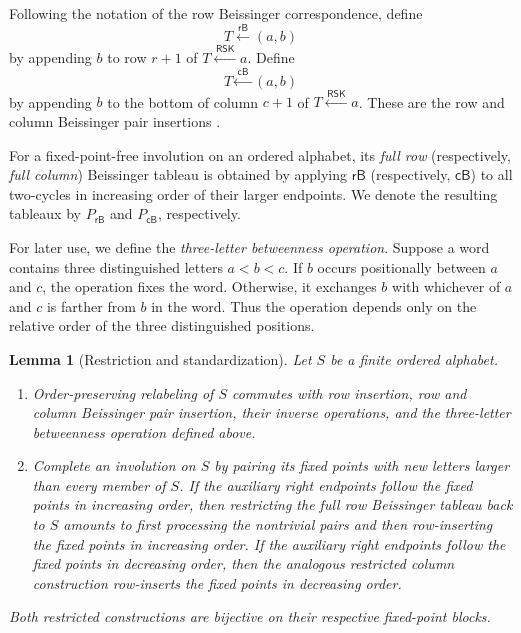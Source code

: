 \documentclass[11pt]{article}
\newtheorem{lemma}[theorem]{Lemma}
\theoremstyle{definition}
\theoremstyle{remark}
\newcommand{\PRBS}{P_{\mathsf{rB}}}
\newcommand{\PCBS}{P_{\mathsf{cB}}}
\newcommand{\fromRSK}{\xleftarrow{\,\mathsf{RSK}\,}}
\newcommand{\fromRBS}{\xleftarrow{\,\mathsf{rB}\,}}
\newcommand{\fromCBS}{\xleftarrow{\,\mathsf{cB}\,}}
\begin{document}
Following the notation of the row Beissinger correspondence, define
\[
 T\fromRBS(a,b)
\]
by appending $b$ to row $r+1$ of $T\fromRSK a$.  Define
\[
 T\fromCBS(a,b)
\]
by appending $b$ to the bottom of column $c+1$ of $T\fromRSK a$.
These are the row and column Beissinger pair insertions
\cite{Beissinger,MZInsertion}.

For a fixed-point-free involution on an ordered alphabet, its \emph{full
row} (respectively, \emph{full column}) Beissinger tableau is obtained by
applying $\mathsf{rB}$ (respectively, $\mathsf{cB}$) to all two-cycles in
increasing order of their larger endpoints.  We denote the resulting
tableaux by $\PRBS$ and $\PCBS$, respectively.

For later use, we define the \emph{three-letter betweenness operation}.
Suppose a word contains three distinguished letters $a<b<c$.  If $b$
occurs positionally between $a$ and $c$, the operation fixes the word.
Otherwise, it exchanges $b$ with whichever of $a$ and $c$ is farther from
$b$ in the word.  Thus the operation depends only on the relative order of
the three distinguished positions.

\begin{lemma}[Restriction and standardization]
\label{lem:restriction-standardization}
Let $S$ be a finite ordered alphabet.
\begin{enumerate}[label=\textup{(\alph*)}]
\item Order-preserving relabeling of $S$ commutes with row insertion,
row and column Beissinger pair insertion, their inverse operations, and
the three-letter betweenness operation defined above.
\item Complete an involution on $S$ by pairing its fixed points with new
letters larger than every member of $S$.  If the auxiliary right endpoints
follow the fixed points in increasing order, then restricting the full row
Beissinger tableau back to $S$ amounts to first processing the nontrivial
pairs and then row-inserting the fixed points in increasing order.  If the
auxiliary right endpoints follow the fixed points in decreasing order,
then the analogous restricted column construction row-inserts the fixed
points in decreasing order.
\end{enumerate}
Both restricted constructions are bijective on their respective
fixed-point blocks.
\end{lemma}
\end{document}
